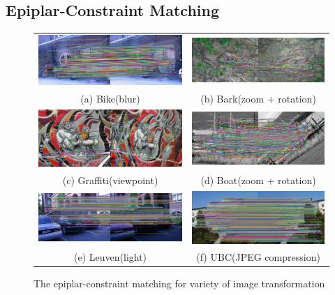 \subsection {Epiplar-Constraint Matching}
\begin{figure}[H]
\begin{tabular}{cc}
  \includegraphics[width=75mm]{figures/bike_final_1_3} &  \includegraphics[width=75mm]{figures/barks_final_1_3} \\
(a) Bike(blur) & (b) Bark(zoom + rotation) \\[6pt]
 \includegraphics[width=75mm]{figures/graffiti_final_1_3} &  \includegraphics[width=75mm]{figures/boat_final_1_3} \\
(c) Graffiti(viewpoint) & (d) Boat(zoom + rotation) \\[6pt]
 \includegraphics[width=75mm]{figures/leuven_final_1_3} &  \includegraphics[width=75mm]{figures/ubc_final_1_3} \\
(e) Leuven(light) & (f) UBC(JPEG compression) \\[6pt]
\end{tabular}
\caption{The epiplar-constraint matching for variety of image transformation}\label{fig:epipolar_matching}
\end{figure}

